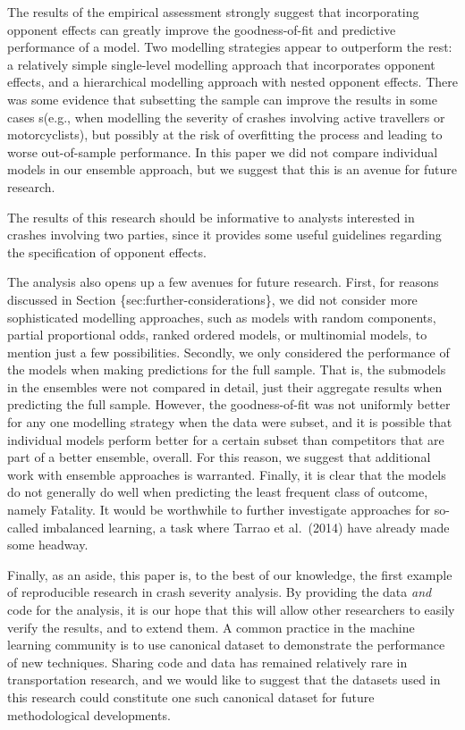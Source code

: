 \documentclass[]{elsarticle} %
\begin{document}
The results of the empirical assessment strongly suggest that
incorporating opponent effects can greatly improve the goodness-of-fit
and predictive performance of a model. Two modelling strategies appear
to outperform the rest: a relatively simple single-level modelling
approach that incorporates opponent effects, and a hierarchical
modelling approach with nested opponent effects. There was some evidence
that subsetting the sample can improve the results in some cases s(e.g.,
when modelling the severity of crashes involving active travellers or
motorcyclists), but possibly at the risk of overfitting the process and
leading to worse out-of-sample performance. In this paper we did not
compare individual models in our ensemble approach, but we suggest that
this is an avenue for future research.

The results of this research should be informative to analysts
interested in crashes involving two parties, since it provides some
useful guidelines regarding the specification of opponent effects.

The analysis also opens up a few avenues for future research. First, for
reasons discussed in Section \{sec:further-considerations\}, we did not
consider more sophisticated modelling approaches, such as models with
random components, partial proportional odds, ranked ordered models, or
multinomial models, to mention just a few possibilities. Secondly, we
only considered the performance of the models when making predictions
for the full sample. That is, the submodels in the ensembles were not
compared in detail, just their aggregate results when predicting the
full sample. However, the goodness-of-fit was not uniformly better for
any one modelling strategy when the data were subset, and it is possible
that individual models perform better for a certain subset than
competitors that are part of a better ensemble, overall. For this
reason, we suggest that additional work with ensemble approaches is
warranted. Finally, it is clear that the models do not generally do well
when predicting the least frequent class of outcome, namely Fatality. It
would be worthwhile to further investigate approaches for so-called
imbalanced learning, a task where Tarrao et al.~(2014) have already made
some headway.

Finally, as an aside, this paper is, to the best of our knowledge, the
first example of reproducible research in crash severity analysis. By
providing the data \emph{and} code for the analysis, it is our hope that
this will allow other researchers to easily verify the results, and to
extend them. A common practice in the machine learning community is to
use canonical dataset to demonstrate the performance of new techniques.
Sharing code and data has remained relatively rare in transportation
research, and we would like to suggest that the datasets used in this
research could constitute one such canonical dataset for future
methodological developments.
\end{document}

